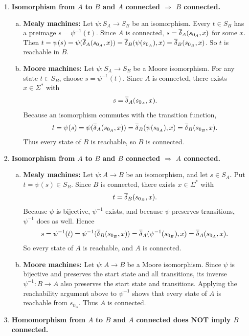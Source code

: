 \begin{enumerate}[{7.}1.]
\item \textbf{Isomorphism from $A$ to $B$ and $A$ connected $\Rightarrow$ $B$ connected.}

\begin{enumerate}[(a)]
  \item \textbf{Mealy machines:}  Let $\psi:S_A\to S_B$ be an isomorphism.  Every $t\in S_B$ has a preimage $s=\psi^{-1}(t)$.  Since $A$ is connected, $s=\overline{\delta}_A(s_{0_A},x)$ for some $x$.  Then $t=\psi(s)=\psi(\overline{\delta}_A(s_{0_A},x))=\overline{\delta}_B(\psi(s_{0_A}),x)=\overline{\delta}_B(s_{0_B},x)$.  So $t$ is reachable in $B$.

  \item \textbf{Moore machines:}  Let $\psi:S_A\to S_B$ be a Moore
  isomorphism.  For any state $t\in S_B$, choose $s=\psi^{-1}(t)$.  Since $A$
  is connected, there exists $x\in\Sigma^*$ with
  \[
    s=\overline{\delta}_A(s_{0_A},x).
  \]
  Because an isomorphism commutes with the transition function,
  \[
    t=\psi(s)=\psi(\overline{\delta}_A(s_{0_A},x))=\overline{\delta}_B(\psi(s_{0_A}),x)=\overline{\delta}_B(s_{0_B},x).
  \]
  Thus every state of $B$ is reachable, so $B$ is connected.
\end{enumerate}

\item \textbf{Isomorphism from $A$ to $B$ and $B$ connected $\Rightarrow$ $A$ connected.}

\begin{enumerate}[(a)]
  \item \textbf{Mealy machines:}  Let $\psi:A\to B$ be an isomorphism, and let
  $s\in S_A$.  Put $t=\psi(s)\in S_B$.  Since $B$ is connected, there exists
  $x\in\Sigma^*$ with
  \[
    t=\overline{\delta}_B(s_{0_B},x).
  \]
  Because $\psi$ is bijective, $\psi^{-1}$ exists, and because $\psi$ preserves
  transitions, $\psi^{-1}$ does as well.  Hence
  \[
    s=\psi^{-1}(t)=\psi^{-1}(\overline{\delta}_B(s_{0_B},x))
    =\overline{\delta}_A(\psi^{-1}(s_{0_B}),x)=\overline{\delta}_A(s_{0_A},x).
  \]
  So every state of $A$ is reachable, and $A$ is connected.

  \item \textbf{Moore machines:}  Let $\psi:A\to B$ be a Moore isomorphism. Since
  $\psi$ is bijective and preserves the start state and all transitions, its
  inverse $\psi^{-1}:B\to A$ also preserves the start state and transitions.
  Applying the reachability argument above to $\psi^{-1}$ shows that every state
  of $A$ is reachable from $s_{0_A}$. Thus $A$ is connected.
\end{enumerate}

\item \textbf{Homomorphism from $A$ to $B$ and $A$ connected does NOT imply $B$ connected.}


\end{enumerate}
